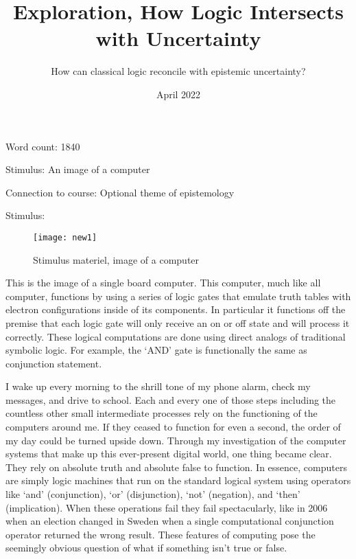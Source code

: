 \documentclass{article}
\title{Exploration, How Logic Intersects with Uncertainty}
\author{How can classical logic reconcile with epistemic uncertainty?}
\date{April 2022}
\begin{document}
\begin{titlepage}
\maketitle

\begin{center}
Word count: 1840

Stimulus: An image of a computer 

Connection to course: Optional theme of epistemology
\end{center}
\end{titlepage}

\begin{center}
{\huge Stimulus:}


\begin{figure}[h]
    \centering
    \texttt{[image: new1]}
    \caption{Stimulus materiel, image of a computer}
    \label{fig:mesh1}
\end{figure}


\end{center}
This is the image of a single board computer. This computer, much like all computer, functions by using a series of logic gates that emulate truth tables with electron configurations inside of its components. In particular it functions off the premise that each logic gate will only receive an on or off state and will process it correctly. These logical computations are done using direct analogs of traditional symbolic logic. For example, the ‘AND’ gate is functionally the same as conjunction statement.

\newpage

I wake up every morning to the shrill tone of my phone alarm, check my messages, and drive to school. Each and every one of those steps including the countless other small intermediate processes rely on the functioning of the computers around me. If they ceased to function for even a second, the order of my day could be turned upside down. Through my investigation of the computer systems that make up this ever-present digital world, one thing became clear. They rely on absolute truth and absolute false to function. In essence, computers are simply logic machines that run on the standard logical system using operators like ‘and’ (conjunction), ‘or’ (disjunction), ‘not’ (negation), and ‘then’ (implication). When these operations fail they fail spectacularly, like in 2006 when an election changed in Sweden when a single computational conjunction operator returned the wrong result. These features of computing pose the seemingly obvious question of what if something isn’t true or false.
\end{document}

